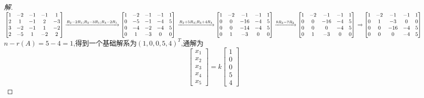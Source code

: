 \documentclass[10pt,a4paper]{report}
\begin{document}
\begin{proof}[解]
	$
	\left[
	\begin{matrix}
	1 & -2 & -1 & -1 & 1 \\
	2 & 1 & -1 & 2 & -3\\
	3 & -2 & -1 & 1 & -2\\
	2 & -5 & 1 & -2 & 2
	\end{matrix}
	\right] 
	\xrightarrow{R_{2}-2R_{1};R_{3}-3R_{1};R_{4}-2R_{1}}
	\left[
	\begin{matrix}
	1 & -2 & -1 & -1 & 1 \\
	0 & -5 & -1 & -4 & 5 \\
	0 & -4 & -2 & -4 & 5\\
	0 & 1 & -3 & 0 & 0
	\end{matrix}
	\right]\\
	\xrightarrow{R_{2}+5R_{4};R_{3}+4R_{4}}
	\left[
	\begin{matrix}
	1 & -2 & -1 & -1 & 1 \\
	0 & 0 & -16 & -4 & 5 \\
	0 & 0 & -14 & -4 & 5\\
	0 & 1 & -3 & 0 & 0
	\end{matrix}
	\right]
	\xrightarrow{8R_{3}-7R_{2}}
	\left[
	\begin{matrix}
	1 & -2 & -1 & -1 & 1 \\
	0 & 0 & -16 & -4 & 5 \\
	0 & 0 & 0 & -4 & 5\\
	0 & 1 & -3 & 0 & 0
	\end{matrix}
	\right]\\
	\xrightarrow{}
	\left[
	\begin{matrix}
	1 & -2 & -1 & -1 & 1 \\
	0 & 1 & -3 & 0 & 0\\
	0 & 0 & -16 & -4 & 5 \\
	0 & 0 & 0 & -4 & 5
	\end{matrix}
	\right]\\
	$
	$n-r(A)=5-4=1$,得到一个基础解系为$(1,0,0,5,4)^{T}$,通解为
	$$
	\left[
	\begin{matrix}
	x_{1}\\
	x_{2}\\
	x_{3}\\
	x_{4}\\
	x_{5}
	\end{matrix}
	\right] = k
	\left[
	\begin{matrix}
	1\\
	0\\
	0\\
	5\\
	4
	\end{matrix}
	\right]
	$$
\end{proof}
\end{document}

